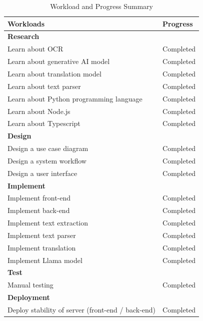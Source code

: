 \documentclass[12pt,oneside,openright,a4paper]{cpe-english-project}
\begin{document}
\begin{table}[H]
  \centering
  \caption{Workload and Progress Summary}
  \label{tbl:workload-and-progress-summary}
  \begin{tabular}{|p{8cm}|p{4cm}|}
    \hline
    \textbf{Workloads}    & \textbf{Progress} \\
    \hline
    \textbf{Research}                                   &                   \\
     Learn about OCR          & Completed         \\
    Learn about generative AI model           & Completed         \\
    Learn about translation model            & Completed         \\
    Learn about text parser            & Completed         \\
    Learn about Python programming language             & Completed         \\
    Learn about Node.js                                 & Completed         \\
    Learn about Typescript                              & Completed         \\
    \hline
    \textbf{Design}                                     &                   \\
    Design a use case diagram                           & Completed         \\
    Design a system workflow                            & Completed         \\
    Design a user interface                             & Completed         \\
    \hline
    \textbf{Implement}                                  &                   \\
    Implement front-end                                 & Completed         \\
    Implement back-end                                  & Completed         \\
    Implement text extraction                                  & Completed        \\
    Implement text parser                                  & Completed        \\
    Implement translation                                  & Completed         \\
    Implement Llama model                                  & Completed         \\
    \hline
    \textbf{Test}                                       &                   \\
    Manual testing                                        & Completed         \\
    \hline
    \textbf{Deployment}                                   &                   \\
    Deploy stability of server (front-end / back-end) & Completed       \\
    \hline
  \end{tabular}
\end{table}
\end{document}
